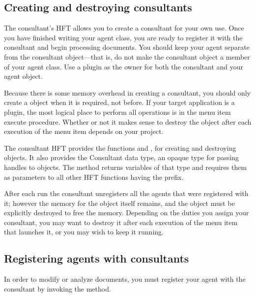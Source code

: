 \documentclass[letterpaper,12pt,english,openany,oneside]{sphinxmanual}
\begin{document}
\subsection{Creating and destroying consultants}
\label{\detokenize{Plugins_ExtendedAPI:creating-and-destroying-consultants}}
The consultant’s HFT allows you to create a consultant for your own use. Once you have finished writing your agent class, you are ready to register it with the consultant and begin processing documents. You should keep your agent separate from the consultant object—that is, do not make the consultant object a member of your agent class. Use a plugin as the owner for both the consultant and your agent object.

Because there is some memory overhead in creating a consultant, you should only create a  object when it is required, not before. If your target application is a plugin, the most logical place to perform all operations is in the menu item execute procedure. Whether or not it makes sense to destroy the  object after each execution of the menu item depends on your project.

The consultant HFT provides the functions  and , for creating and destroying  objects. It also provides the Consultant data type, an opaque type for passing handles to  objects. The  method returns variables of that type and requires them as parameters to all other HFT functions having the  prefix.

After each run the consultant unregisters all the agents that were registered with it; however the memory for the  object itself remains, and the object must be explicitly destroyed to free the memory. Depending on the duties you assign your consultant, you may want to destroy it after each execution of the menu item that launches it, or you may wish to keep it running.


\subsection{Registering agents with consultants}
\label{\detokenize{Plugins_ExtendedAPI:registering-agents-with-consultants}}
In order to modify or analyze documents, you must register your agent with the consultant by invoking the  method.
\end{document}
